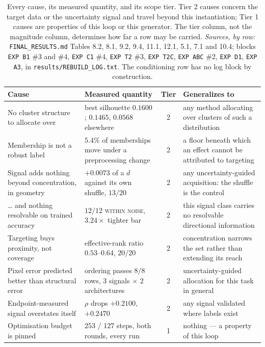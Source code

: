 \documentclass{article} %
\begin{document}
\begin{table}[t]
\caption{Every cause, its measured quantity, and its scope tier. Tier 2 causes concern the target
data or the uncertainty signal and travel beyond this instantiation; Tier 1 causes are properties of
this loop or this generator. The tier column, not the magnitude column, determines how far a row may
be carried. \emph{Sources, by row:} \texttt{FINAL\_RESULTS.md} Tables 8.2, 8.1, 9.2, 9.4, 11.1, 12.1,
5.1, 7.1 and 10.4; blocks \texttt{EXP B1} \#3 and \#4, \texttt{EXP C1} \#4, \texttt{EXP T2} \#3,
\texttt{EXP T2C}, \texttt{EXP ABC} \#2, \texttt{EXP D1}, \texttt{EXP A3}, in
\texttt{results/REBUILD\_LOG.txt}. The conditioning row has no log block by construction.}
\label{tab:causes}
\begin{center}
\small
\begin{tabular}{p{3.1cm}p{4.0cm}cp{3.6cm}}
\toprule
Cause & Measured quantity & Tier & Generalizes to \\
\midrule
No cluster structure to allocate over & best silhouette $0.1600$; $0.1465$, $0.0568$ elsewhere & 2 & any method allocating over clusters of such a distribution \\
Membership is not a robust label & $5.4\%$ of memberships move under a preprocessing change & 2 & a floor beneath which an effect cannot be attributed to targeting \\
Signal adds nothing beyond concentration, in geometry & $+0.0073$ of a $d$ against its own shuffle, $13/20$ & 2 & any uncertainty-guided acquisition: the shuffle is the control \\
\ldots{} and nothing resolvable on trained accuracy & $12/12$ \textsc{within noise}, $3.24\times$ tighter bar & 2 & this signal class carries no resolvable directional information \\
Targeting buys proximity, not coverage & effective-rank ratio $0.53$--$0.64$, $20/20$ & 2 & concentration narrows the set rather than extending its reach \\
Pixel error predicted better than structural error & ordering passes $8/8$ rows, 3 signals $\times$ 2 architectures & 2 & uncertainty-guided allocation for this task in general \\
Endpoint-measured signal overstates itself & $\rho$ drops $+0.2100$, $+0.2470$ & 2 & any signal validated where labels exist \\
\midrule
Optimisation budget is pinned & $253$ / $127$ steps, both rounds, every run & 1 & nothing --- a property of this loop \\

\end{tabular}
\end{center}
\end{table}
\end{document}
